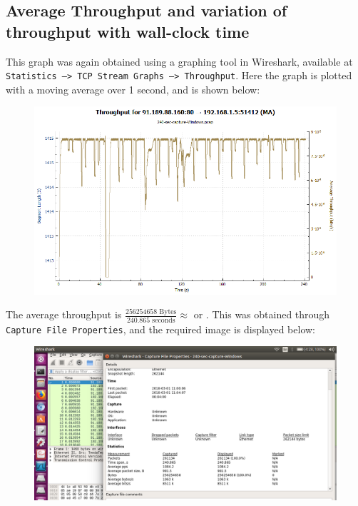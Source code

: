 \documentclass{article}
\begin{document}
\subsection{Average Throughput and variation of throughput with wall-clock time}
\begin{flushleft}
This graph was again obtained using a graphing tool in Wireshark, available at \texttt{Statistics --> TCP Stream Graphs --> Throughput}. Here the graph is plotted with a moving average over 1 second, and is shown below:
\begin{figure}[H]
\centering
\includegraphics[width=0.55\linewidth]{Throughput-variation-240-sec-capture-Windows.png}
\end{figure}

The average throughput is \(\frac{256254658 \text{ Bytes}}{240.865 \text{ seconds}} \approx \)  or . This was obtained through \texttt{Capture File Properties}, and the required image is displayed below:
\begin{figure}[H]
\centering
\includegraphics[width=0.55\linewidth]{Packet-capture-stats-240-sec-capture-Windows.png}
\end{figure}
\end{flushleft}
\end{document}
